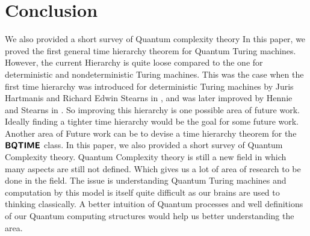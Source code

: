 \documentclass[11pt,a4paper]{article}
\newcommand{\classX}[1]{\ensuremath{\text{\textsf{\textbf{#1}}}}}
\newcommand{\BQ}{\classX{BQTIME}}
\begin{document}
\section*{Conclusion}
We also provided a short survey of Quantum complexity theory
    In this paper, we proved the first general time hierarchy theorem for Quantum Turing machines. 
    However, the current Hierarchy is quite loose compared to the one for deterministic and nondeterministic Turing machines.
    This was the case when the first time hierarchy was introduced for deterministic Turing machines by Juris Hartmanis and Richard Edwin Stearns in \cite{25}, and was later improved by Hennie and Stearns in \cite{26}.
    So improving this hierarchy is one possible area of future work. Ideally finding a tighter time hierarchy would be the goal for some future work.
    Another area of Future work can be to devise a time hierarchy theorem for the $\BQ$ class. In this paper, we also provided a short survey of Quantum Complexity theory. 
    Quantum Complexity theory is still a new field in which many aspects are still not defined. Which gives us a lot of area of research to be done in the field. The issue is understanding Quantum Turing machines and computation by this model is itself quite difficult as our brains are used to thinking classically. 
    A better intuition of Quantum processes and well definitions of our Quantum computing structures would help us better understanding the area.
\end{document}
